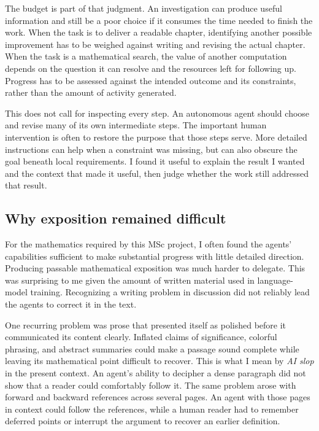 The budget is part of that judgment. An investigation can produce useful
information and still be a poor choice if it consumes the time needed to
finish the work. When the task is to deliver a readable chapter, identifying
another possible improvement has to be weighed against writing and revising
the actual chapter. When the task is a mathematical search, the value of
another computation depends on the question it can resolve and the resources
left for following up. Progress has to be assessed against the intended
outcome and its constraints, rather than the amount of activity generated.

This does not call for inspecting every step. An autonomous agent should
choose and revise many of its own intermediate steps. The important human
intervention is often to restore the purpose that those steps serve. More
detailed instructions can help when a constraint was missing, but can also
obscure the goal beneath local requirements. I found it useful to explain
the result I wanted and the context that made it useful, then judge whether
the work still addressed that result.

\subsection{Why exposition remained difficult}

For the mathematics required by this MSc project, I often found the agents'
capabilities sufficient to make substantial progress with little detailed
direction. Producing passable mathematical exposition was much harder to
delegate. This was surprising to me given the amount of written material
used in language-model training. Recognizing a writing problem in discussion
did not reliably lead the agents to correct it in the text.

One recurring problem was prose that presented itself as polished before it
communicated its content clearly. Inflated claims of significance, colorful
phrasing, and abstract summaries could make a passage sound complete while
leaving its mathematical point difficult to recover. This is what I mean by
\emph{AI slop} in the present context. An agent's ability to decipher a dense
paragraph did not show that a reader could comfortably follow it. The same
problem arose with forward and backward references across several pages.
An agent with those pages in context could follow the references, while a
human reader had to remember deferred points or interrupt the argument to
recover an earlier definition.

